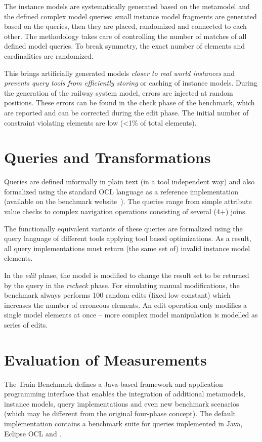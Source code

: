 The instance models are systematically generated based on the metamodel and the
defined complex model queries: small instance model fragments are generated
based on the queries, then they are placed, randomized and connected to each
other. The methodology takes care of controlling the number of matches of all
defined model queries. To break symmetry, the exact number of elements and
cardinalities are randomized.
 
This brings artificially generated models \emph{closer to real world instances}
and \emph{prevents query tools from efficiently storing} or caching of instance
models. During the generation of the railway system model, errors are injected
at random positions. These errors can be found in the check phase of the
benchmark, which are reported and can be corrected during the edit phase. The
initial number of constraint violating elements are low (<1\% of total
elements).
 
\section{Queries and Transformations}
Queries are defined informally in plain text (in a tool independent way) and
also formalized using the standard OCL language as a reference implementation
(available on the benchmark website~\cite{TBwebsite}). The queries range from
simple attribute value checks to complex navigation operations consisting of
several (4+) joins.

The functionally equivalent variants of these queries are formalized using the
query language of different tools applying tool based optimizations. As a
result, all query implementations must return (the same set of) invalid instance
model elements.
 
In the \emph{edit} phase, the model is modified to change the result set to be
returned by the query in the \emph{recheck} phase. For simulating manual
modifications, the benchmark always performs 100 random edits (fixed low
constant) which increases the number of erroneous elements. An edit operation
only modifies a single model elements at once -- more complex model manipulation is
modelled as series of edits.

\section{Evaluation of Measurements}
The Train Benchmark defines a Java-based framework and application programming
interface that enables the integration of additional metamodels, instance
models, query implementations and even new benchmark scenarios (which may be
different from the original four-phase concept). The default implementation
contains a benchmark suite for queries implemented in Java, Eclipse OCL and
\eiq.

